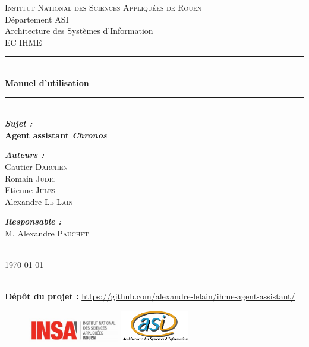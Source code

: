 \begin{titlepage}
\newcommand{\HRule}{\rule{\linewidth}{0.5mm}}
\center
{}\textsc{\huge Institut National des Sciences Appliquées de Rouen}\\[0.7cm]
\LARGE Département ASI~\\[0.5cm]
\Large{Architecture des Systèmes d'Information} ~\\[1.5cm]
\textsc{\Large EC IHME}\\[1cm]

\HRule \\[0.4cm]
{ \huge \bfseries Manuel d'utilisation}\\[0.2cm] \HRule \\[1.5cm]

\LARGE \emph{\textbf{Sujet :}} \\
\textbf{Agent assistant \emph{Chronos}}\\[2cm]

\large
\begin{minipage}[c]{.3\linewidth}
	\begin{flushleft}
       \emph{\textbf{Auteurs :}}\\
       Gautier \textsc{Darchen}\\
       Romain \textsc{Judic}\\
       Etienne \textsc{Jules}\\
        Alexandre \textsc{Le Lain}

	\end{flushleft}
   \end{minipage} \hfill
   \begin{minipage}[c]{.3\linewidth}
  	 \begin{flushright}
 	\emph{\textbf{Responsable :}}\\
		M. Alexandre \textsc{Pauchet}
	\end{flushright}
   \end{minipage}

~\\[1.5cm]

\vfill{\today}

~\\[1.5cm]
\textbf{Dépôt du projet : } \url{https://github.com/alexandre-lelain/ihme-agent-assistant/}

\begin{figure}
\includegraphics[width=4cm]{images/LogoINSA.png}\hfill
\includegraphics[width=3cm]{images/logoasi.png}
\end{figure}


 \end{titlepage}
